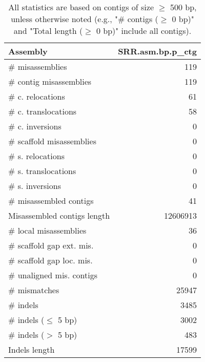 \documentclass[12pt,a4paper]{article}
\begin{document}
\begin{table}[ht]
\begin{center}
\caption{All statistics are based on contigs of size $\geq$ 500 bp, unless otherwise noted (e.g., "\# contigs ($\geq$ 0 bp)" and "Total length ($\geq$ 0 bp)" include all contigs).}
\begin{tabular}{|l*{1}{|r}|}
\hline
Assembly & SRR.asm.bp.p\_ctg \\ \hline
\# misassemblies & 119 \\ \hline
\hspace{2mm}\# contig misassemblies & 119 \\ \hline
\hspace{5mm}\# c. relocations & 61 \\ \hline
\hspace{5mm}\# c. translocations & 58 \\ \hline
\hspace{5mm}\# c. inversions & 0 \\ \hline
\hspace{2mm}\# scaffold misassemblies & 0 \\ \hline
\hspace{5mm}\# s. relocations & 0 \\ \hline
\hspace{5mm}\# s. translocations & 0 \\ \hline
\hspace{5mm}\# s. inversions & 0 \\ \hline
\# misassembled contigs & 41 \\ \hline
Misassembled contigs length & 12606913 \\ \hline
\# local misassemblies & 36 \\ \hline
\# scaffold gap ext. mis. & 0 \\ \hline
\# scaffold gap loc. mis. & 0 \\ \hline
\# unaligned mis. contigs & 0 \\ \hline
\# mismatches & 25947 \\ \hline
\# indels & 3485 \\ \hline
\hspace{5mm}\# indels ($\leq$ 5 bp) & 3002 \\ \hline
\hspace{5mm}\# indels ($>$ 5 bp) & 483 \\ \hline
Indels length & 17599 \\ \hline
\end{tabular}
\end{center}
\end{table}
\end{document}
